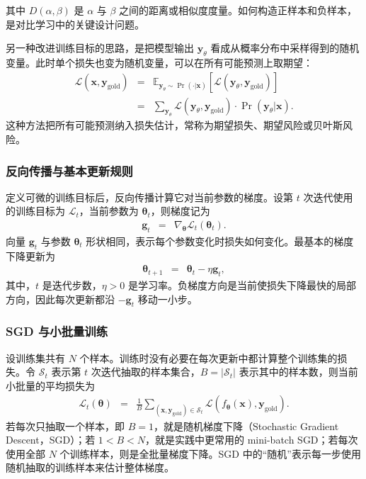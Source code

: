 \noindent 其中 $D(\alpha,\beta)$ 是 $\alpha$ 与 $\beta$ 之间的距离或相似度度量。如何构造正样本和负样本，是对比学习中的关键设计问题。

另一种改进训练目标的思路，是把模型输出 $\mathbf{y}_{\theta}$ 看成从概率分布中采样得到的随机变量。此时单个损失也变为随机变量，可以在所有可能预测上取期望：
\begin{eqnarray}
\mathcal{L}(\mathbf{x},\mathbf{y}_{\mathrm{gold}})
& = &
\mathbb{E}_{\mathbf{y}_{\theta}\sim\Pr(\cdot|\mathbf{x})}
\left[
\mathcal{L}(\mathbf{y}_{\theta},\mathbf{y}_{\mathrm{gold}})
\right] \nonumber \\
& = &
\sum_{\mathbf{y}_{\theta}}
\mathcal{L}(\mathbf{y}_{\theta},\mathbf{y}_{\mathrm{gold}})
\cdot
\Pr(\mathbf{y}_{\theta}|\mathbf{x}).
\end{eqnarray}
这种方法把所有可能预测纳入损失估计，常称为期望损失、期望风险或贝叶斯风险。

\subsubsection{反向传播与基本更新规则}

定义可微的训练目标后，反向传播计算它对当前参数的梯度。设第 $t$ 次迭代使用的训练目标为 $\mathcal{L}_t$，当前参数为 $\boldsymbol{\theta}_t$，则梯度记为
\begin{eqnarray}
\mathbf{g}_t
& = &
\nabla_{\boldsymbol{\theta}}
\mathcal{L}_t(\boldsymbol{\theta}_t).
\end{eqnarray}
向量 $\mathbf{g}_t$ 与参数 $\boldsymbol{\theta}_t$ 形状相同，表示每个参数变化时损失如何变化。最基本的梯度下降更新为
\begin{eqnarray}
\boldsymbol{\theta}_{t+1}
& = &
\boldsymbol{\theta}_t-\eta\mathbf{g}_t,
\end{eqnarray}
其中，$t$ 是迭代步数，$\eta>0$ 是学习率。负梯度方向是当前使损失下降最快的局部方向，因此每次更新都沿 $-\mathbf{g}_t$ 移动一小步。

\subsubsection{SGD 与小批量训练}

设训练集共有 $N$ 个样本。训练时没有必要在每次更新中都计算整个训练集的损失。令 $\mathcal{S}_t$ 表示第 $t$ 次迭代抽取的样本集合，$B=|\mathcal{S}_t|$ 表示其中的样本数，则当前小批量的平均损失为
\begin{eqnarray}
\mathcal{L}_t(\boldsymbol{\theta})
& = &
\frac{1}{B}
\sum_{(\mathbf{x},\mathbf{y}_{\mathrm{gold}})\in\mathcal{S}_t}
\mathcal{L}\!\left(
f_{\boldsymbol{\theta}}(\mathbf{x}),
\mathbf{y}_{\mathrm{gold}}
\right).
\end{eqnarray}
若每次只抽取一个样本，即 $B=1$，就是随机梯度下降（Stochastic Gradient Descent，SGD）；若 $1<B<N$，就是实践中更常用的 mini-batch SGD；若每次使用全部 $N$ 个训练样本，则是全批量梯度下降。SGD 中的“随机”表示每一步使用随机抽取的训练样本来估计整体梯度。

